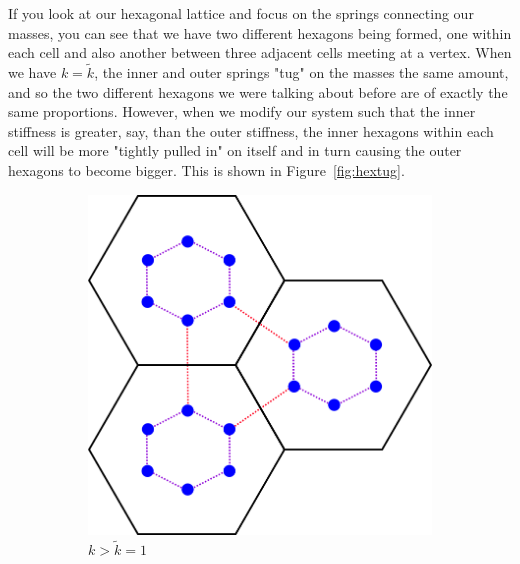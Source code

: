 If you look at our hexagonal lattice and focus on the springs connecting our
masses, you can see that we have two different hexagons being formed, one
within each cell and also another between three adjacent cells meeting at a
vertex. When we have $k=\tilde{k}$, the inner and outer springs "tug" on the
masses the same amount, and so the two different hexagons we were talking about
before are of exactly the same proportions. However, when we modify our system
such that the inner stiffness is greater, say, than the outer stiffness, the
inner hexagons within each cell will be more "tightly pulled in" on itself and
in turn causing the outer hexagons to become bigger. This is shown in
Figure~\ref{fig:hextug}.

\begin{figure}[!h]
\begin{subfigure}[b]{.33\textwidth}
  \centering
  \includegraphics[width=1\linewidth]{imgs/hextugsmall.png}
  \caption{$k>\tilde{k}=1$}
\end{subfigure}%
\begin{subfigure}[b]{.33\textwidth}
  \centering

\end{subfigure}
\end{figure}
